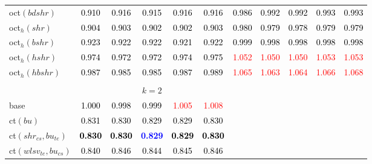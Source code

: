 \begin{tabular}[t]{l|>{}cccc>{}c|ccccc}
oct$(bdshr)$ & \textcolor{black}{0.910} & \textcolor{black}{0.916} & \textcolor{black}{0.915} & \textcolor{black}{0.916} & \textcolor{black}{0.916} & \textcolor{black}{0.986} & \textcolor{black}{0.992} & \textcolor{black}{0.992} & \textcolor{black}{0.993} & \textcolor{black}{0.993}\\
oct$_h(shr)$ & \textcolor{black}{0.904} & \textcolor{black}{0.903} & \textcolor{black}{0.902} & \textcolor{black}{0.902} & \textcolor{black}{0.903} & \textcolor{black}{0.980} & \textcolor{black}{0.979} & \textcolor{black}{0.978} & \textcolor{black}{0.979} & \textcolor{black}{0.979}\\
oct$_h(bshr)$ & \textcolor{black}{0.923} & \textcolor{black}{0.922} & \textcolor{black}{0.922} & \textcolor{black}{0.921} & \textcolor{black}{0.922} & \textcolor{black}{0.999} & \textcolor{black}{0.998} & \textcolor{black}{0.998} & \textcolor{black}{0.998} & \textcolor{black}{0.998}\\
oct$_h(hshr)$ & \textcolor{black}{0.974} & \textcolor{black}{0.972} & \textcolor{black}{0.972} & \textcolor{black}{0.974} & \textcolor{black}{0.975} & \textcolor{red}{1.052} & \textcolor{red}{1.050} & \textcolor{red}{1.050} & \textcolor{red}{1.053} & \textcolor{red}{1.053}\\
oct$_h(hbshr)$ & \textcolor{black}{0.987} & \textcolor{black}{0.985} & \textcolor{black}{0.985} & \textcolor{black}{0.987} & \textcolor{black}{0.989} & \textcolor{red}{1.065} & \textcolor{red}{1.063} & \textcolor{red}{1.064} & \textcolor{red}{1.066} & \textcolor{red}{1.068}\\[-1.5ex]
\hline\\[-1.5ex]
\addlinespace[0.3em]
\multicolumn{1}{c}{} & \multicolumn{5}{c}{\textbf{$k = 2$}} & \multicolumn{5}{c}{}\\
base & \textcolor{black}{1.000} & \textcolor{black}{0.998} & \textcolor{black}{0.999} & \textcolor{red}{1.005} & \textcolor{red}{1.008} &  &  &  &  & \\
ct$(bu)$ & \textcolor{black}{0.831} & \textcolor{black}{0.830} & \textcolor{black}{0.829} & \textcolor{black}{0.829} & \textcolor{black}{0.830} &  &  &  &  & \\
ct$(shr_{cs}, bu_{te})$ & \textcolor{black}{\textbf{0.830}} & \textcolor{black}{\textbf{0.830}} & \textcolor{blue}{\textbf{0.829}} & \textcolor{black}{\textbf{0.829}} & \textcolor{black}{\textbf{0.830}} &  &  &  &  & \\
ct$(wlsv_{te}, bu_{cs})$ & \textcolor{black}{0.840} & \textcolor{black}{0.846} & \textcolor{black}{0.844} & \textcolor{black}{0.845} & \textcolor{black}{0.846} &  &  &  &  & \\

\end{tabular}
